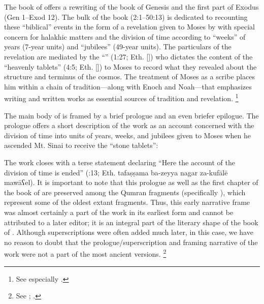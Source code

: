The book of \jub offers a rewriting of the book of Genesis and the first part of Exodus (Gen 1--Exod 12).\autocite[1:17]{vanderkam2018} The bulk of the book (2:1--50:13) is dedicated to recounting these ``biblical'' events in the form of a revelation given to Moses by \yahweh with special concern for halakhic matters and the division of time according to ``weeks'' of years (7-year units) and ``jubilees'' (49-year units). The particulars of the revelation are mediated by the ``\ap'' (1:27; Eth.  []) who dictates the content of the ``heavenly tablets'' (4:5; Eth.  []) to Moses to record what they revealed about the structure and terminus of the cosmos.\autocite{martinez_najman-tigchelaar2012} The treatment of Moses as a scribe places him within a chain of tradition---along with Enoch and Noah---that emphasizes writing and written works as essential sources of tradition and revelation.%
        \footnote{See especially
                \cite[381--388]{najman_jsj1999}.} 

The main body of \jub is framed by a brief prologue and an even briefer epilogue. The prologue offers a short description of the work as an account concerned with the division of time into units of years, weeks, and jubilees given to Moses when he ascended Mt. Sinai to receive the ``stone tablets'':

%
\noindent
The work closes with a terse statement declaring ``Here the account of the division of time is ended'' (:13; Eth. 
        {tafaṣṣama ba-zeyya nagar za-kufālē mawāʕel}).
\noindent
It is important to note that this prologue as well as the first chapter of the book of \jub are preserved among the Qumran fragments (specifically ), which represent some of the oldest extant \jub fragments. Thus, this early narrative frame was almost certainly a part of the work in its earliest form and cannot be attributed to a later editor; it is an integral part of the literary shape of the book of \jub. Although superscriptions were often added much later, in this case, we have no reason to doubt that the prologue/superscription and framing narrative of the work were not a part of the most ancient versions.%
        \footnote{See 
                \cite[1:125]{vanderkam2018};
                \cite[25]{vanderkam_metso-etal2010}.}

